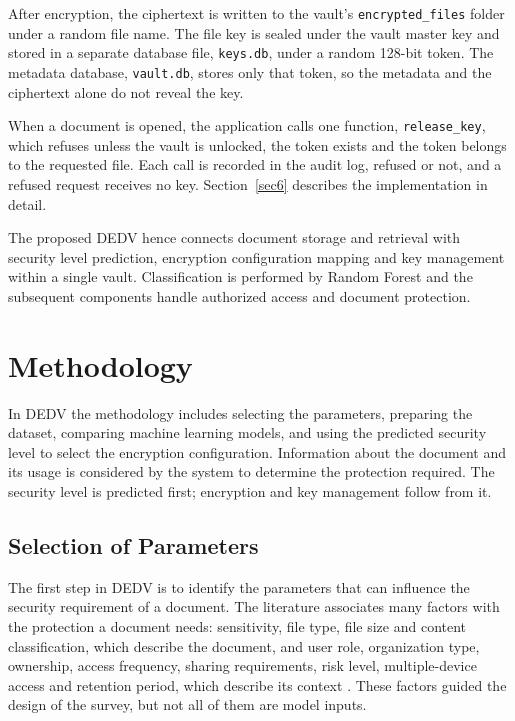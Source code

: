 \documentclass[pdflatex,sn-mathphys-num]{sn-jnl}
\newcommand{\code}[1]{\texttt{#1}}
\begin{document}
After encryption, the ciphertext is written to the vault's \code{encrypted\_files} folder under a
random file name. The file key is sealed under the vault master key and stored in a separate
database file, \code{keys.db}, under a random 128-bit token. The metadata database,
\code{vault.db}, stores only that token, so the metadata and the ciphertext alone do not reveal
the key.

When a document is opened, the application calls one function, \code{release\_key}, which refuses
unless the vault is unlocked, the token exists and the token belongs to the requested file. Each
call is recorded in the audit log, refused or not, and a refused request receives no key.
Section~\ref{sec6} describes the implementation in detail.

The proposed DEDV hence connects document storage and retrieval with security level prediction,
encryption configuration mapping and key management within a single vault. Classification is
performed by Random Forest and the subsequent components handle authorized access and document
protection.

\section{Methodology}\label{sec5}

In DEDV the methodology includes selecting the parameters, preparing the dataset, comparing
machine learning models, and using the predicted security level to select the encryption
configuration. Information about the document and its usage is considered by the system to
determine the protection required. The security level is predicted first; encryption and key
management follow from it.

\subsection{Selection of Parameters}\label{sec5-1}

The first step in DEDV is to identify the parameters that can influence the security requirement
of a document. The literature associates many factors with the protection a document needs:
sensitivity, file type, file size and content classification, which describe the document, and
user role, organization type, ownership, access frequency, sharing requirements, risk level,
multiple-device access and retention period, which describe its context \cite{phoha2014context}.
These factors guided the design of the survey, but not all of them are model inputs.
\end{document}
